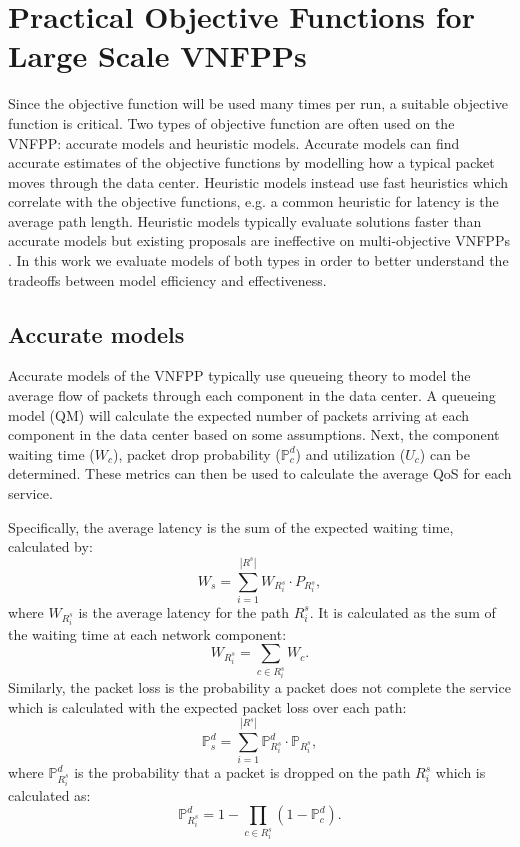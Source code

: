 \section{Practical Objective Functions for Large Scale VNFPPs}
\label{sec:practical_objective_functions}
Since the objective function will be used many times per run, a suitable objective function is critical. Two types of objective function are often used on the VNFPP: accurate models and heuristic models. Accurate models can find accurate estimates of the objective functions by modelling how a typical packet moves through the data center. Heuristic models instead use fast heuristics which correlate with the objective functions, e.g. a common heuristic for latency is the average path length. Heuristic models typically evaluate solutions faster than accurate models but existing proposals are ineffective on multi-objective VNFPPs \cite{BillingsleyLMMG22}. In this work we evaluate models of both types in order to better understand the tradeoffs between model efficiency and effectiveness.

\subsection{Accurate models}
Accurate models of the VNFPP typically use queueing theory to model the average flow of packets through each component in the data center. A queueing model (QM) will calculate the expected number of packets arriving at each component in the data center based on some assumptions. Next, the component waiting time ($W_c$), packet drop probability ($\mathbb{P}^d_c$) and utilization ($U_c$) can be determined. These metrics can then be used to calculate the average QoS for each service. 

Specifically, the average latency is the sum of the expected waiting time, calculated by:
\begin{equation}
	W_s=\sum_{i=1}^{|R^s|} W_{R^s_i} \cdot P_{R^s_i},
    \label{eq:wt_service}
\end{equation}
where $W_{R^s_i}$ is the average latency for the path $R^s_i$. It is calculated as the sum of the waiting time at each network component:
\begin{equation}
	W_{R^s_i} = \sum_{c\in R^s_i} W_c.
    \label{eq:wt_path}
\end{equation}
Similarly, the packet loss is the probability a packet does not complete the service which is calculated with the expected packet loss over each path: 
\begin{equation}
    \mathbb{P}^d_s=\sum_{i=1}^{|R^s|} \mathbb{P}^d_{R^s_i}\cdot \mathbb{P}_{R^s_i},
	\label{eq:pl_service}
\end{equation}
where $\mathbb{P}^d_{R^s_i}$ is the probability that a packet is dropped on the path $R^s_i$ which is calculated as:
\begin{equation}
	\mathbb{P}^d_{R^s_i}=1-\prod_{c\in R^s_i}\left(1-\mathbb{P}^d_c\right).
	\label{eq:pl_path}
\end{equation}

